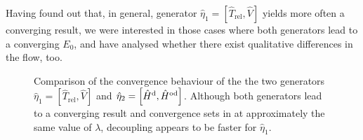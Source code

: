 Having found out that, in general, generator $\hat{\eta}_1 = \left[ \hat{T}_{\text{rel}}, \hat{V}\right]$ yields more often a converging result, we were interested in those cases where both generators lead to a converging $E_0$, and have analysed whether there exist qualitative differences in the flow, too. 

\begin{figure}
\begin{center}
\end{center}
\caption{Comparison of the convergence behaviour of the the two generators $\hat{\eta}_1 = \left[ \hat{T}_{\text{rel}}, \hat{V}\right]$ and $\hat{\eta}_2 = \left[ \hat{H}^{\rm d}, \hat{H}^{\rm od} \right]$. Although both generators lead to a converging result and convergence sets in at approximately the same value of $\lambda$, decoupling appears to be faster for $\hat{\eta}_1$.}
\label{fig:EtaComp}
\end{figure}

